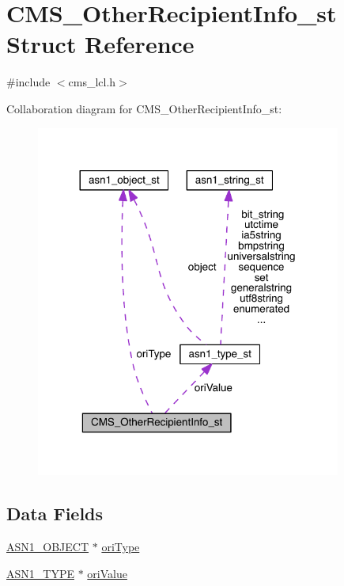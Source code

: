 \hypertarget{struct_c_m_s___other_recipient_info__st}{}\section{C\+M\+S\+\_\+\+Other\+Recipient\+Info\+\_\+st Struct Reference}
\label{struct_c_m_s___other_recipient_info__st}


{\ttfamily \#include $<$cms\+\_\+lcl.\+h$>$}



Collaboration diagram for C\+M\+S\+\_\+\+Other\+Recipient\+Info\+\_\+st\+:\nopagebreak
\begin{figure}[H]
\begin{center}
\leavevmode
\includegraphics[width=284pt]{struct_c_m_s___other_recipient_info__st__coll__graph}
\end{center}
\end{figure}
\subsection*{Data Fields}
\begin{DoxyCompactItemize}
\item 
\hyperlink{crypto_2ossl__typ_8h_ae3fda0801e4c8e250087052bafb3ce2e}{A\+S\+N1\+\_\+\+O\+B\+J\+E\+CT} $\ast$ \hyperlink{struct_c_m_s___other_recipient_info__st_a39ef9c59ccc7cee2f1544408fb21cb52}{ori\+Type}
\item 
\hyperlink{crypto_2asn1_2asn1_8h_a7895e03d9fee2bc4963faf2a31a9439e}{A\+S\+N1\+\_\+\+T\+Y\+PE} $\ast$ \hyperlink{struct_c_m_s___other_recipient_info__st_a14ea7d5b53186a58c7f73aba7f621a05}{ori\+Value}
\end{DoxyCompactItemize}


